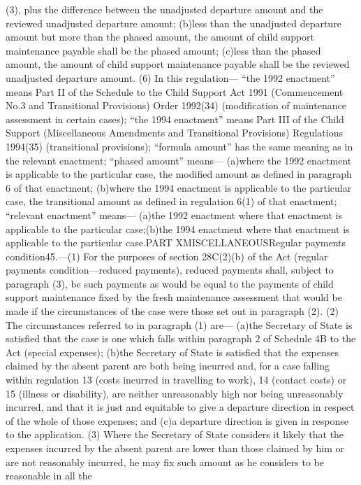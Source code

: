 \documentclass[a4paper]{article}
\begin{document}
(3), plus the difference between the unadjusted departure amount and the
reviewed unadjusted departure amount;
(b)less than the unadjusted departure amount but more than the phased amount,
the amount of child support maintenance payable shall be the phased amount;
(c)less than the phased amount, the amount of child support maintenance payable
shall be the reviewed unadjusted departure amount.
(6) In this regulation—
“the 1992 enactment” means Part II of the Schedule to the Child Support Act 1991
(Commencement No.3 and Transitional Provisions) Order 1992(34) (modification of
maintenance assessment in certain cases);
“the 1994 enactment” means Part III of the Child Support (Miscellaneous
Amendments and Transitional Provisions) Regulations 1994(35) (transitional
provisions);
“formula amount” has the same meaning as in the relevant enactment;
“phased amount” means—
(a)where the 1992 enactment is applicable to the particular case, the modified
amount as defined in paragraph 6 of that enactment;
(b)where the 1994 enactment is applicable to the particular case, the
transitional amount as defined in regulation 6(1) of that enactment;
“relevant enactment” means—
(a)the 1992 enactment where that enactment is applicable to the particular case;(b)the 1994 enactment where that enactment is applicable to the particular case.PART XMISCELLANEOUSRegular payments condition45.—(1) For the purposes of section
28C(2)(b) of the Act (regular payments condition—reduced payments), reduced
payments shall, subject to paragraph (3), be such payments as would be equal to
the payments of child support maintenance fixed by the fresh maintenance
assessment that would be made if the circumstances of the case were those set
out in paragraph (2).
(2) The circumstances referred to in paragraph (1) are—
(a)the Secretary of State is satisfied that the case is one which falls within
paragraph 2 of Schedule 4B to the Act (special expenses);
(b)the Secretary of State is satisfied that the expenses claimed by the absent
parent are both being incurred and, for a case falling within regulation 13
(costs incurred in travelling to work), 14 (contact costs) or 15 (illness or
disability), are neither unreasonably high nor being unreasonably incurred, and
that it is just and equitable to give a departure direction in respect of the
whole of those expenses; and
(c)a departure direction is given in response to the application.
(3) Where the Secretary of State considers it likely that the expenses incurred
by the absent parent are lower than those claimed by him or are not reasonably
incurred, he may fix such amount as he considers to be reasonable in all the
\end{document}
